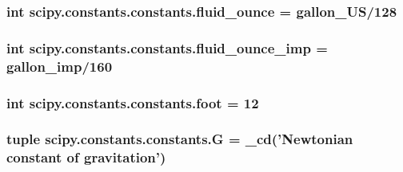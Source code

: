 \subsubsection[{fluid\+\_\+ounce}]{\setlength{\rightskip}{0pt plus 5cm}int scipy.\+constants.\+constants.\+fluid\+\_\+ounce = gallon\+\_\+\+U\+S/128}\label{namespacescipy_1_1constants_1_1constants_a04d29fd12e4e0427765747422196e301}
\hypertarget{namespacescipy_1_1constants_1_1constants_a6e15717b77cb98b68d8e23d874bbe5b2}{}
\subsubsection[{fluid\+\_\+ounce\+\_\+imp}]{\setlength{\rightskip}{0pt plus 5cm}int scipy.\+constants.\+constants.\+fluid\+\_\+ounce\+\_\+imp = {\bf gallon\+\_\+imp}/160}\label{namespacescipy_1_1constants_1_1constants_a6e15717b77cb98b68d8e23d874bbe5b2}
\hypertarget{namespacescipy_1_1constants_1_1constants_a06b551de5b0999c6683f6697b333bd86}{}
\subsubsection[{foot}]{\setlength{\rightskip}{0pt plus 5cm}int scipy.\+constants.\+constants.\+foot = 12}\label{namespacescipy_1_1constants_1_1constants_a06b551de5b0999c6683f6697b333bd86}
\hypertarget{namespacescipy_1_1constants_1_1constants_a41b06e2e1ecf933321d2f9d1d2da9384}{}
\subsubsection[{G}]{\setlength{\rightskip}{0pt plus 5cm}tuple scipy.\+constants.\+constants.\+G = \+\_\+cd('Newtonian constant of gravitation')}\label{namespacescipy_1_1constants_1_1constants_a41b06e2e1ecf933321d2f9d1d2da9384}
\hypertarget{namespacescipy_1_1constants_1_1constants_a83effeb17733c44ab49399687fb4d21b}{}
